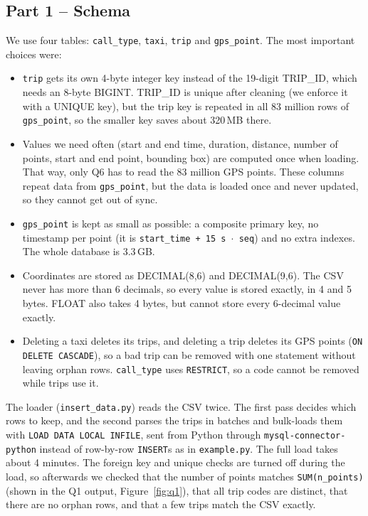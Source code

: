 \documentclass[12pt,a4paper]{article}
\begin{document}
\subsection*{Part 1 -- Schema}

We use four tables: \texttt{call\_type}, \texttt{taxi}, \texttt{trip} and
\texttt{gps\_point}. The most important choices were:
\begin{itemize}
  \item \texttt{trip} gets its own 4-byte integer key instead of the
        19-digit TRIP\_ID, which needs an 8-byte BIGINT. TRIP\_ID is unique
        after cleaning (we enforce it with a UNIQUE key), but the trip key is
        repeated in all 83 million rows of \texttt{gps\_point}, so the
        smaller key saves about 320\,MB there.
  \item Values we need often (start and end time, duration, distance,
        number of points, start and end point, bounding box) are computed
        once when loading. That way, only Q6 has to read the 83 million
        GPS points. These columns repeat data from \texttt{gps\_point}, but
        the data is loaded once and never updated, so they cannot get out
        of sync.
  \item \texttt{gps\_point} is kept as small as possible: a composite primary
        key, no timestamp per point (it is \texttt{start\_time + 15 s $\cdot$ seq})
        and no extra indexes. The whole database is 3.3\,GB.
  \item Coordinates are stored as DECIMAL(8,6) and DECIMAL(9,6). The CSV
        never has more than 6 decimals, so every value is stored exactly, in
        4 and 5 bytes. FLOAT also takes 4 bytes, but cannot store every
        6-decimal value exactly.
  \item Deleting a taxi deletes its trips, and deleting a trip deletes its
        GPS points (\texttt{ON DELETE CASCADE}), so a bad trip can be removed
        with one statement without leaving orphan rows. \texttt{call\_type}
        uses \texttt{RESTRICT}, so a code cannot be removed while trips use
        it.
\end{itemize}

The loader (\texttt{insert\_data.py}) reads the CSV twice. The first pass
decides which rows to keep, and the second parses the trips in batches and
bulk-loads them with \texttt{LOAD DATA LOCAL INFILE}, sent from Python
through \texttt{mysql-connector-python} instead of row-by-row
\texttt{INSERT}s as in \texttt{example.py}. The full load takes about
4 minutes. The foreign key and unique checks are turned off during the
load, so afterwards we checked that the number of points matches
\texttt{SUM(n\_points)} (shown in the Q1 output, Figure~\ref{fig:q1}), that
all trip codes are distinct, that there are no orphan rows, and that a few
trips match the CSV exactly.
\end{document}
